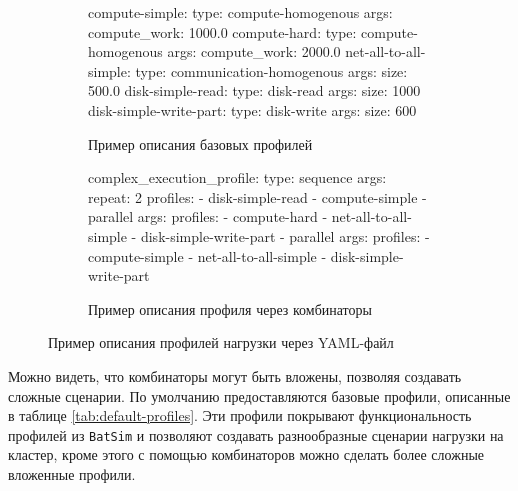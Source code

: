 \begin{figure}[h!]
    \footnotesize
\begin{subfigure}{0.5\textwidth}
    \begin{yamlcode}
    compute-simple: 
      type: compute-homogenous
      args: 
        compute_work: 1000.0 
    compute-hard:
      type: compute-homogenous
      args:
        compute_work: 2000.0
    net-all-to-all-simple:
      type: communication-homogenous
      args: 
        size: 500.0 
    disk-simple-read: 
      type: disk-read 
      args: 
        size: 1000
    disk-simple-write-part: 
      type: disk-write 
      args: 
        size: 600  
    \end{yamlcode}
    \caption{Пример описания базовых профилей}
\end{subfigure}
\begin{subfigure}{0.5\textwidth}
    \begin{yamlcode}
complex_execution_profile:
  type: sequence
  args:
    repeat: 2
    profiles:
      - disk-simple-read
      - compute-simple
      - parallel
        args:
          profiles:
            - compute-hard
            - net-all-to-all-simple
      - disk-simple-write-part
      - parallel
        args:
          profiles:
            - compute-simple
            - net-all-to-all-simple
      - disk-simple-write-part
\end{yamlcode}
    \caption{Пример описания профиля через комбинаторы}
\end{subfigure}
\caption{Пример описания профилей нагрузки через YAML-файл}
\label{fig:profile-yaml}
\end{figure}

Можно видеть, что комбинаторы могут быть вложены, позволяя создавать сложные сценарии. По умолчанию предоставляются базовые профили, описанные в таблице \ref{tab:default-profiles}. Эти профили покрывают функциональность профилей из \texttt{BatSim}\cite{batsim-profile-types-overview} и позволяют создавать разнообразные сценарии нагрузки на кластер, кроме этого с помощью комбинаторов можно сделать более сложные вложенные профили.

